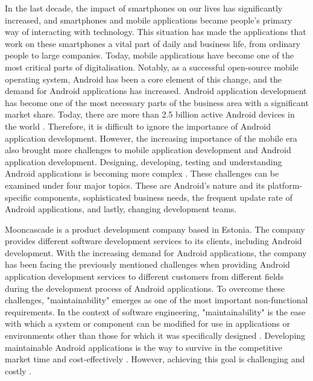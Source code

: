 In the last decade, the impact of smartphones on our lives has significantly increased, and smartphones and mobile applications became people's primary way of interacting with technology. This situation has made the applications that work on these smartphones a vital part of daily and business life, from ordinary people to large companies. Today, mobile applications have become one of the most critical parts of digitalisation. Notably, as a successful open-source mobile operating system, Android has been a core element of this change, and the demand for Android applications has increased. Android application development has become one of the most necessary parts of the business area with a significant market share. Today, there are more than 2.5 billion active Android devices in the world \cite{1}. Therefore, it is difficult to ignore the importance of Android application development.
However, the increasing importance of the mobile era also brought more challenges to mobile application development and Android application development. Designing, developing, testing and understanding Android applications is becoming more complex \cite{34}. These challenges can be examined under four major topics. These are Android’s nature and its platform-specific components, sophisticated business needs, the frequent update rate of Android applications, and lastly, changing development teams. 

Mooncascade is a  product development company based in Estonia. The company provides different software development services to its clients, including Android development. With the increasing demand for Android applications, the company has been facing the previously mentioned challenges when providing Android application development services to different customers from different fields during the development process of Android applications. To overcome these challenges, "maintainability" emerges as one of the most important non-functional requirements. In the context of software engineering, "maintainability" is the ease with which a system or component can be modified for use in applications or environments other than those for which it was specifically designed \cite{20}. Developing maintainable Android applications is the way to survive in the competitive market time and cost-effectively \cite{50}. However, achieving this goal is challenging and costly \cite{34}.

